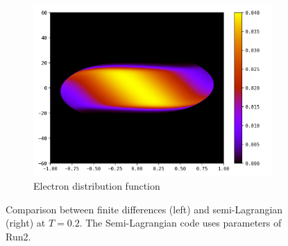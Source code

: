 \documentclass{article}
\numberwithin{equation}{section}
\newcommand{\imh}{\textheight} %
\newcommand{\imw}{\textwidth} %
\begin{document}
\begin{figure}
\begin{subfigure}{\textwidth}
		\includegraphics[height=\imh,width=\imw]{images/feT0p2.png}
		\caption{Electron distribution function}
		\label{subfig:compT02_electron}
	\end{subfigure}
	\caption{Comparison between finite differences (left) and semi-Lagrangian (right) at $T=0.2$. The Semi-Lagrangian code uses parameters of Run2.}
	\label{fig:compT02}
\end{figure}  
\end{document}
